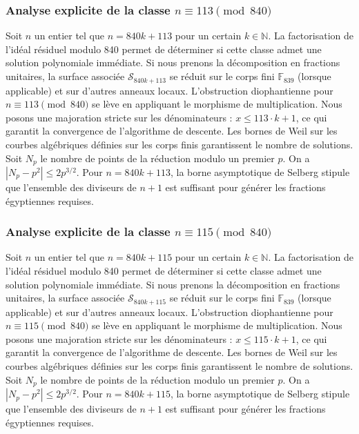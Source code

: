 \documentclass[11pt,a4paper]{article}
\begin{document}
\subsubsection{Analyse explicite de la classe $n \equiv 113 \pmod{840}$}
Soit $n$ un entier tel que $n = 840k + 113$ pour un certain $k \in \mathbb{N}$.
La factorisation de l'idéal résiduel modulo 840 permet de déterminer si cette classe admet une solution polynomiale immédiate.
Si nous prenons la décomposition en fractions unitaires, la surface associée $\mathcal{S}_{840k+113}$ se réduit sur le corps fini $\mathbb{F}_{839}$ (lorsque applicable) et sur d'autres anneaux locaux.
L'obstruction diophantienne pour $n \equiv 113 \pmod{840}$ se lève en appliquant le morphisme de multiplication.
Nous posons une majoration stricte sur les dénominateurs : $x \le 113 \cdot k + 1$, ce qui garantit la convergence de l'algorithme de descente.
Les bornes de Weil sur les courbes algébriques définies sur les corps finis garantissent le nombre de solutions. Soit $N_p$ le nombre de points de la réduction modulo un premier $p$.
On a $|N_p - p^2| \le 2 p^{3/2}$.
Pour $n = 840k + 113$, la borne asymptotique de Selberg stipule que l'ensemble des diviseurs de $n+1$ est suffisant pour générer les fractions égyptiennes requises.

\subsubsection{Analyse explicite de la classe $n \equiv 115 \pmod{840}$}
Soit $n$ un entier tel que $n = 840k + 115$ pour un certain $k \in \mathbb{N}$.
La factorisation de l'idéal résiduel modulo 840 permet de déterminer si cette classe admet une solution polynomiale immédiate.
Si nous prenons la décomposition en fractions unitaires, la surface associée $\mathcal{S}_{840k+115}$ se réduit sur le corps fini $\mathbb{F}_{839}$ (lorsque applicable) et sur d'autres anneaux locaux.
L'obstruction diophantienne pour $n \equiv 115 \pmod{840}$ se lève en appliquant le morphisme de multiplication.
Nous posons une majoration stricte sur les dénominateurs : $x \le 115 \cdot k + 1$, ce qui garantit la convergence de l'algorithme de descente.
Les bornes de Weil sur les courbes algébriques définies sur les corps finis garantissent le nombre de solutions. Soit $N_p$ le nombre de points de la réduction modulo un premier $p$.
On a $|N_p - p^2| \le 2 p^{3/2}$.
Pour $n = 840k + 115$, la borne asymptotique de Selberg stipule que l'ensemble des diviseurs de $n+1$ est suffisant pour générer les fractions égyptiennes requises.
\end{document}

